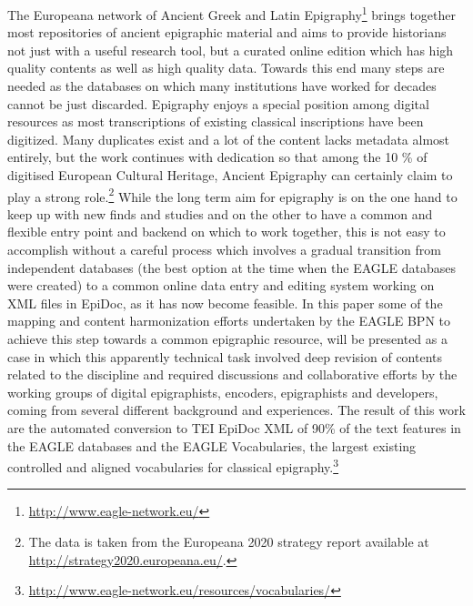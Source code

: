 \documentclass[amsthm,ebook]{saparticle}
\begin{document}
\noindent The Europeana network of Ancient Greek and Latin Epigraphy\footnote{\citet{OrlandiCasarosa2014} \citet{Orlandi2014} \citet{liuzzo2014} \url{http://www.eagle-network.eu/}} brings
together most repositories of ancient epigraphic material and aims to
provide historians not just with a useful research tool, but a
curated online edition which has high quality contents as well as high
quality data. Towards this end many steps are needed as the databases on which many institutions have worked for decades cannot be just discarded. Epigraphy enjoys a special position among digital resources as most transcriptions of existing classical inscriptions have been digitized. Many duplicates exist and a lot of the content lacks metadata almost entirely, but the work continues with dedication so that among the 10 \% of digitised European Cultural Heritage, Ancient Epigraphy can certainly claim to play a strong role.\footnote{The data is taken from the Europeana 2020 strategy report available at \url{http://strategy2020.europeana.eu/}.} While the long term aim for epigraphy is on the one hand to keep up with new finds and studies and on the other to have a common and flexible entry point and backend on which to work together, this is not easy to accomplish without a careful process which involves a gradual transition from independent databases (the best option at the time when the EAGLE databases were created) to a common online data entry and editing system working on XML files in EpiDoc, as it has now become feasible.   
In this paper some of the mapping and content harmonization efforts undertaken by the EAGLE BPN to achieve this step towards a common epigraphic resource, will be presented as a case in which this apparently technical task involved deep revision of contents related to the discipline and required discussions and collaborative efforts by the working
groups of digital epigraphists, encoders, epigraphists and developers, coming from several different background and experiences. The result of this work are the automated conversion to TEI EpiDoc XML of 90\% of the text features in the EAGLE databases and the EAGLE Vocabularies, the largest existing controlled and aligned vocabularies for classical epigraphy.\footnote{\url{http://www.eagle-network.eu/resources/vocabularies/}} 
\end{document}
